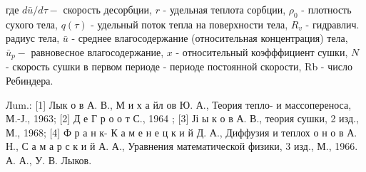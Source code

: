 \documentclass[10pt]{article}
\begin{document}
где $d \bar{u} / d \tau-$ скорость десорбции, $r$ - удельная теплота сорбции, $\rho_{0}$ - плотность сухого тела, $q(\tau)$ - удельный поток тепла на поверхности тела, $R_{v}$ - гидравлич. радиус тела, $\bar{u}$ - среднее влагосодержание (относительная концентрация) тела, $\bar{u}_{p}-$ равновесное влагосодержание, $x$ - относительный коэфффициент сушки, $N$ - скорость сушки в первом периоде - периоде постоянной скорости, Rb - число Ребиндера.



Лum.: [1] Лык о в А. В., М и х а йл ов Ю. А., Теория тепло- и массопереноса, М.-Ј., 1963; [2] Д е Г р о о т С., 1964 ; [3] Јі ы к о в А. В., теория сушки, 2 изд., М., 1968; [4] Ф р а н к- К а м е н е ц к и й Д. А., Диффузия и теплох о н о в А. Н., С а м а р с к и й А. А., Уравнения математической физики, 3 изд., М., 1966. А. А., У. В. Лыков.
\end{document}
